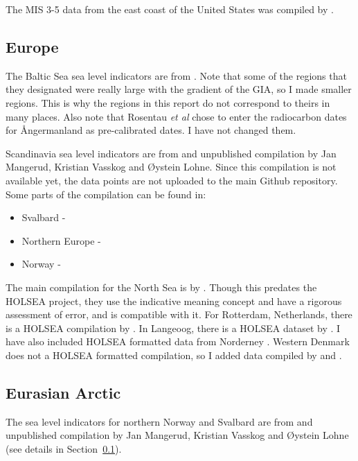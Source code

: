 The MIS 3-5 data from the east coast of the United States was compiled by \citet{PicoEtal2017}.

\subsection{Europe}

\label{sec:Europe}

The Baltic Sea sea level indicators are from \citep{RosentauEtal2021}. Note that some of the regions that they designated were really large with the gradient of the GIA, so I made smaller regions. This is why the regions in this report do not correspond to theirs in many places. Also note that Rosentau \emph{et al} chose to enter the radiocarbon dates for {\AA}ngermanland as pre-calibrated dates. I have not changed them.


Scandinavia sea level indicators are from and unpublished compilation by Jan Mangerud, Kristian Vasskog and \O{}ystein Lohne. Since this compilation is not available yet, the data points are not uploaded to the main Github repository. Some parts of the compilation can be found in:

\begin{itemize}
  \item Svalbard - \citet{BondevikEtal1995}
  \item Northern Europe - \citet{FormanEtal2004}
  \item Norway - \citet{LohneEtal2007,RomundsetEtal2010,RomundsetEtal2011,RomundsetEtal2015,RomundsetEtal2018,VasskogEtal2019}
\end{itemize}

The main compilation for the North Sea is by \citet{VinkEtal2007}. Though this predates the HOLSEA project, they use the indicative meaning concept and have a rigorous assessment of error, and is compatible with it. For Rotterdam, Netherlands, there is a HOLSEA compilation by \citet{HijmaCohen2019}. In Langeoog, there is a HOLSEA dataset by \citet{BungenstockEtal2021}. I have also included HOLSEA formatted data from Norderney \citep{SchederEtal2022}. Western Denmark does not a HOLSEA formatted compilation, so I added data compiled by \citet{GehrelsEtal2006} and \citet{JessenEtal2019}.


\subsection{Eurasian Arctic}

The sea level indicators for northern Norway and Svalbard are from and unpublished compilation by Jan Mangerud, Kristian Vasskog and \O{}ystein Lohne (see details in Section~\ref{sec:Europe}).

